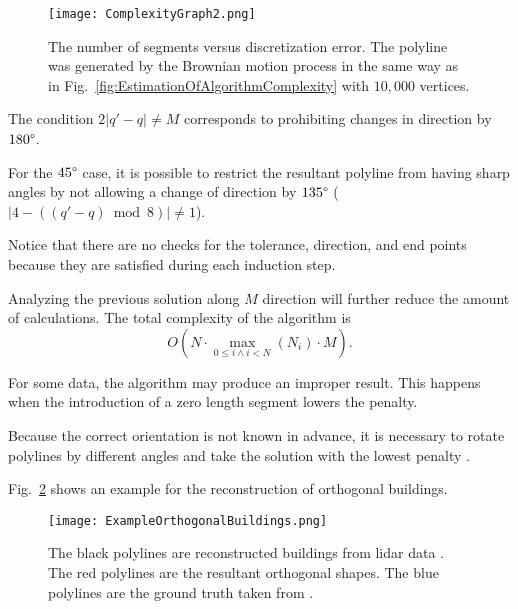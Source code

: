 \documentclass[conference]{IEEEtran}
\begin{document}
\begin{figure} [t]
  \centering
    \texttt{[image: ComplexityGraph2.png]}
  \caption
  {
    The number of segments versus discretization error. The polyline was generated by the Brownian motion process in the same way as in Fig.~\ref{fig:EstimationOfAlgorithmComplexity} with $10,000$ vertices.
  }
  \label{fig:GraphCompressionEfficiency}
\end{figure}

The condition $2 \left| q' - q \right| \neq M$ corresponds to prohibiting changes in direction by $180 \degree$.

For the $45 \degree$ case, it is possible to restrict the resultant polyline from having sharp angles by not allowing a change of direction by $135 \degree$ ($\left| 4 - \left( \left( q' - q \right) \bmod 8 \right) \right| \neq 1$).

Notice that there are no checks for the tolerance, direction, and end points because they are satisfied during each induction step.

Analyzing the previous solution along $M$ direction will further reduce the amount of calculations. The total complexity of the algorithm is
\begin{equation*}
  O{\left( N \cdot \max_{0 \leq i \wedge i < N}{\left( N_i \right)} \cdot M \right)}
  .
\end{equation*}

For some data, the algorithm may produce an improper result. This happens when the introduction of a zero length segment lowers the penalty.

Because the correct orientation is not known in advance, it is necessary to rotate polylines by different angles and take the solution with the lowest penalty \cite[see section 6]{ReconstructionOfOrthogonalPolygonalLines}.

Fig.~\ref{fig:ExampleOrthogonalBuildings} shows an example for the reconstruction of orthogonal buildings.

\begin{figure} [htb]
  \centering
    \texttt{[image: ExampleOrthogonalBuildings.png]}
  \caption
  {
    The black polylines are reconstructed buildings from lidar data \cite{ReferenceLIDARData}. The red polylines are the resultant orthogonal shapes. The blue polylines are the ground truth taken from \cite{ReferenceGroundTruthData}.
  }
  \label{fig:ExampleOrthogonalBuildings}
\end{figure}
\end{document}
